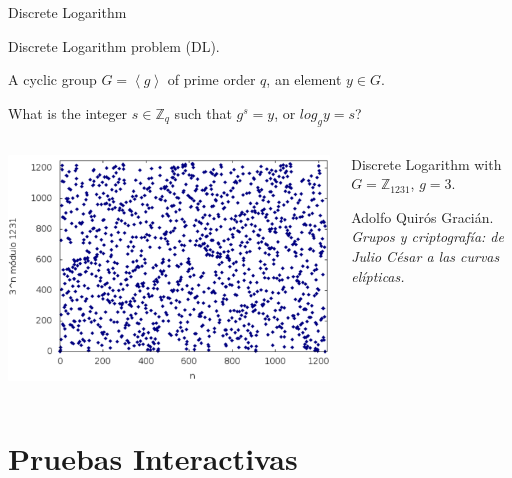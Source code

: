 \documentclass{beamer}
\begin{document}
\begin{frame}{Discrete Logarithm}

	\begin{description}[Question]
		\item[Name] Discrete Logarithm problem (DL).
		\item[Instance] A cyclic group $G=\left\langle g \right\rangle$ of prime order $q$, an element $y\in G$.
		\item[Question] What is the integer  $s\in \mathbb{Z}_q$ such that $g^s = y$, or $log_g y = s$?
	\end{description}

	\begin{columns}

		\begin{column}{0.5\textwidth}
			\includegraphics[width=\linewidth]{DL}
		\end{column}
		\begin{column}{0.5\textwidth}
			Discrete Logarithm with $G=\mathbb{Z}_{1231}$, $g=3$.
			
			\small{Adolfo Quirós Gracián. \textit{Grupos y criptografía: de Julio César a las curvas elípticas.}}
		\end{column}
	
	\end{columns}


\end{frame}






\section{Pruebas Interactivas}
\end{document}
